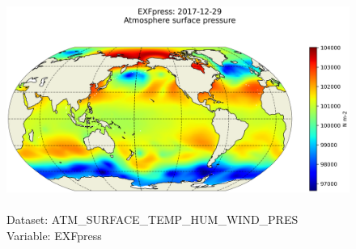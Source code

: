 \begin{figure}[H]
\centering
\includegraphics[scale=0.5]{../images/plots/latlon_plots/Atmosphere_Surface_Temperature_Humidity_Wind_and_Pressure/EXFpress.png}
\caption{\\Dataset: ATM\_SURFACE\_TEMP\_HUM\_WIND\_PRES\\Variable: EXFpress}
\label{tab:table-ATM_SURFACE_TEMP_HUM_WIND_PRES_EXFpress-Plot}
\end{figure}
\pagebreak
